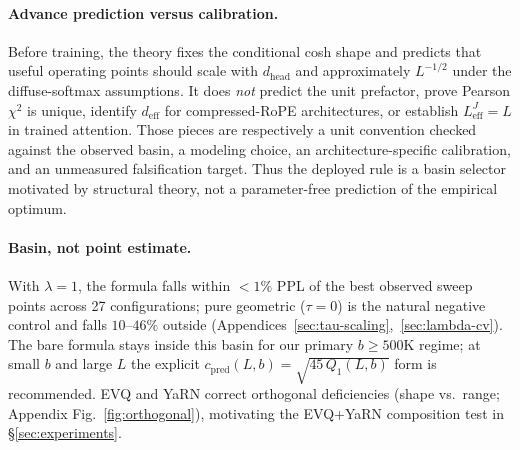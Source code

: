 \paragraph{Advance prediction versus calibration.} Before training, the theory fixes the conditional cosh shape and predicts that useful operating points should scale with $d_{\mathrm{head}}$ and approximately $L^{-1/2}$ under the diffuse-softmax assumptions. It does \emph{not} predict the unit prefactor, prove Pearson $\chi^2$ is unique, identify $d_{\mathrm{eff}}$ for compressed-RoPE architectures, or establish $L_{\mathrm{eff}}^{J}{=}L$ in trained attention. Those pieces are respectively a unit convention checked against the observed basin, a modeling choice, an architecture-specific calibration, and an unmeasured falsification target. Thus the deployed rule is a basin selector motivated by structural theory, not a parameter-free prediction of the empirical optimum.

\paragraph{Basin, not point estimate.} With $\lambda{=}1$, the formula falls within $<1\%$ PPL of the best observed sweep points across 27 configurations; pure geometric ($\tau{=}0$) is the natural negative control and falls $10$--$46\%$ outside (Appendices~\ref{sec:tau-scaling},~\ref{sec:lambda-cv}). The bare formula stays inside this basin for our primary $b{\geq}500\mathrm{K}$ regime; at small $b$ and large $L$ the explicit $c_{\mathrm{pred}}(L,b){=}\sqrt{45\,Q_1(L,b)}$ form is recommended. EVQ and YaRN correct orthogonal deficiencies (shape vs.\ range; Appendix Fig.~\ref{fig:orthogonal}), motivating the EVQ+YaRN composition test in \S\ref{sec:experiments}.

